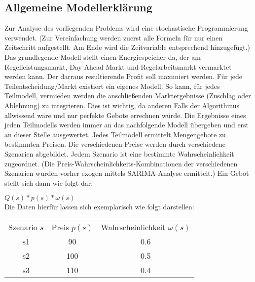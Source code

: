 \subsection{Allgemeine Modellerklärung}
Zur Analyse des vorliegenden Problems wird eine stochastische Programmierung verwendet.
(Zur Vereinfachung werden zuerst alle Formeln für nur einen Zeitschritt aufgestellt. Am Ende wird die Zeitvariable entsprechend hinzugefügt.)
\\
Das grundlegende Modell stellt einen Energiespeicher da, der am Regelleistungsmarkt, Day Ahead Markt und Regelarbeitsmarkt vermarktet werden kann. Der darraus resultierende Profit soll maximiert werden. Für jede Teilentscheidung/Markt existiert ein eigenes Modell. So kann, für jedes Teilmodell, vermieden werden die anschließenden Marktergebnisse (Zuschlag oder Ablehnung) zu integrieren. Dies ist wichtig, da anderen Falls der Algorithmus allwissend wäre und nur perfekte Gebote errechnen würde. Die Ergebnisse eines jeden Teilmodells werden immer an das nachfolgende Modell übergeben und erst an dieser Stelle ausgewertet. Jedes Teilmodell ermittelt Mengengebote zu bestimmten Preisen. Die verschiedenen Preise werden durch verschiedene Szenarien abgebildet. Jedem Szenario ist eine bestimmte Wahrscheinlichkeit zugeordnet. (Die Preis-Wahrscheinlichkeits-Kombinationen der verschiedenen Szenarien wurden vorher exogen mittels SARIMA-Analyse ermittelt.) Ein Gebot stellt sich dann wie folgt dar:

$Q(s) * p(s) * \omega(s)$\\
Die Daten hierfür lassen sich exemplarisch wie folgt darstellen:\\
\begin{tabular}{c|c|c}
	Szenario $s$ & Preis $p(s)$ & Wahrscheinlichkeit $\omega(s)$ \\
	s1           & 90           & 0.6                            \\
	s2           & 100          & 0.5                            \\
	s3           & 110          & 0.4                            \\
\end{tabular}\\


